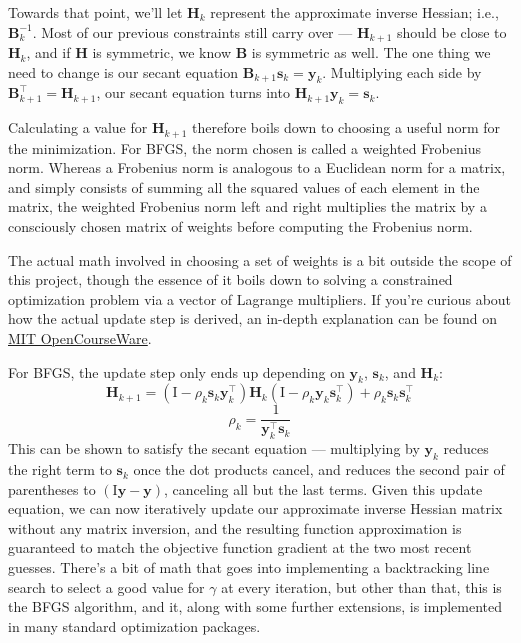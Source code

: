 \documentclass[12pt]{article}
\begin{document}
Towards that point, we'll let \(\mathbf{H}_k\) represent the approximate inverse Hessian; i.e., \(\mathbf{B}_{k}^{-1}\). Most of our previous 
constraints still carry over --- \(\mathbf{H}_{k+1}\) should be close to \(\mathbf{H}_k\), and if \(\mathbf{H}\) is 
symmetric, we know \(\mathbf{B}\) is symmetric as well. The one thing we need to change is our secant equation 
\(\mathbf{B}_{k+1} \mathbf{s}_k = \mathbf{y}_k\). Multiplying each side by \(\mathbf{B}_{k+1}^\top = \mathbf{H}_{k+1}\), our secant equation turns
into \(\mathbf{H}_{k+1} \mathbf{y}_k = \mathbf{s}_k\).

Calculating a value for \(\mathbf{H}_{k+1}\) therefore boils down to choosing a useful norm for the minimization. For BFGS,
the norm chosen is called a weighted Frobenius norm. Whereas a Frobenius norm is analogous to a Euclidean norm for a matrix, and
simply consists of summing all the squared values of each element in the matrix, the weighted Frobenius norm 
left and right multiplies the matrix by a consciously chosen matrix of weights before computing the Frobenius norm.

The actual math involved in choosing a set of weights is a bit outside the scope of this project, though the essence of it boils down to solving a constrained optimization problem via a vector of 
Lagrange multipliers. If you're curious about how the actual update step is derived, an in-depth explanation can be found on \href{https://ocw.mit.edu/courses/18-335j-introduction-to-numerical-methods-spring-2019/1b52b607c223977b35ba1d826e4d8df1_MIT18_335JS19_lec30.pdf}{MIT OpenCourseWare}.

For BFGS, the update step only ends up depending on \(\mathbf{y}_k\), \(\mathbf{s}_k\), and \(\mathbf{H}_k\):
\[\mathbf{H}_{k+1} = (\mathrm{I} - \rho_k \mathbf{s}_k \mathbf{y}_k^\top)\mathbf{H}_k(\mathrm{I} - \rho_k \mathbf{y}_k \mathbf{s}_k^\top) + \rho_k \mathbf{s}_k \mathbf{s}_k^\top\]
\[\rho_k = \frac{1}{\mathbf{y}_k^\top \mathbf{s}_k}\]
This can be shown to satisfy the secant equation --- multiplying by \(\mathbf{y}_k\) reduces the right term to \(\mathbf{s}_k\)
once the dot products cancel, and reduces the second pair of parentheses to \((\mathrm{I}\mathbf{y} - \mathbf{y})\), canceling all but the 
last terms. Given this update equation, we can now iteratively update our approximate inverse Hessian matrix without any
matrix inversion, and the resulting function approximation is guaranteed to match the objective function gradient at the two most recent
guesses. There's a bit of math that goes into implementing a backtracking line search to select a good value for 
\(\gamma\) at every iteration, but other than that, this is the BFGS algorithm, and it, along with some further extensions, is 
implemented in many standard optimization packages. 
\end{document}
